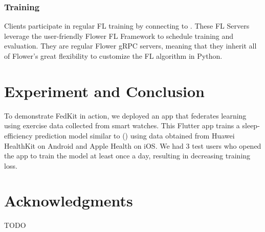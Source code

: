 \documentclass[letterpaper]{article} %
\begin{document}
\subsubsection{Training}
Clients participate in regular FL training by connecting to \fs.
These FL Servers leverage the user-friendly Flower FL Framework to
schedule training and evaluation.
They are regular Flower gRPC servers, meaning that
they inherit all of Flower's great flexibility to customize the FL algorithm in
Python.

\section{Experiment and Conclusion}
To demonstrate FedKit in action,
we deployed an app that federates learning using exercise data collected from
smart watches.
This Flutter app trains a sleep-efficiency prediction model similar to ()
using data obtained from Huawei HealthKit
on Android and Apple Health on iOS.
We had 3 test users who opened the app to train the model at least once a day,
resulting in decreasing training loss.


\appendix

\section*{Acknowledgments}
TODO

\bigskip


\end{document}
